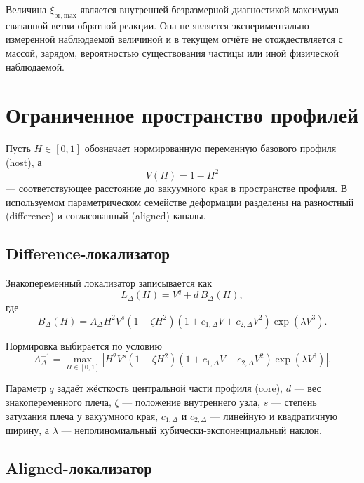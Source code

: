 \documentclass[11pt,a4paper]{article}
\newcommand{\xibr}{\xi_{\mathrm{br,max}}}
\newcommand{\vac}{V}
\newcommand{\host}{H}
\newcommand{\ldiff}{L_{\Delta}}
\begin{document}
Величина $\xibr$ является внутренней безразмерной диагностикой максимума связанной ветви обратной реакции. Она не является экспериментально измеренной наблюдаемой величиной и в текущем отчёте не отождествляется с массой, зарядом, вероятностью существования частицы или иной физической наблюдаемой.

\section{Ограниченное пространство профилей}

Пусть $\host\in[0,1]$ обозначает нормированную переменную базового профиля (host), а
\begin{equation}
\vac(\host)=1-\host^2
\end{equation}
--- соответствующее расстояние до вакуумного края в пространстве профиля. В используемом параметрическом семействе деформации разделены на разностный (difference) и согласованный (aligned) каналы.

\subsection{Difference-локализатор}

Знакопеременный локализатор записывается как
\begin{equation}
\ldiff(\host)
=\vac^q
+d\,B_{\Delta}(\host),
\label{eq:difference_localizer}
\end{equation}
где
\begin{equation}
B_{\Delta}(\host)
=A_{\Delta}\host^2\vac^s
\left(1-\zeta\host^2\right)
\left(1+c_{1,\Delta}\vac+c_{2,\Delta}\vac^2\right)
\exp\!\left(\lambda\vac^3\right).
\label{eq:difference_basis}
\end{equation}

Нормировка выбирается по условию
\begin{equation}
A_{\Delta}^{-1}
=\max_{\host\in[0,1]}
\left|
\host^2\vac^s
\left(1-\zeta\host^2\right)
\left(1+c_{1,\Delta}\vac+c_{2,\Delta}\vac^2\right)
\exp\!\left(\lambda\vac^3\right)
\right|.
\end{equation}

Параметр $q$ задаёт жёсткость центральной части профиля (core), $d$ --- вес знакопеременного плеча, $\zeta$ --- положение внутреннего узла, $s$ --- степень затухания плеча у вакуумного края, $c_{1,\Delta}$ и $c_{2,\Delta}$ --- линейную и квадратичную ширину, а $\lambda$ --- неполиномиальный кубически-экспоненциальный наклон.

\subsection{Aligned-локализатор}
\end{document}

